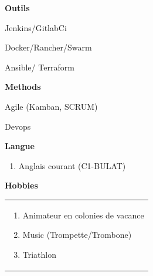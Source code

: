 \documentclass[a4paper,11pt,final]{memoir}
\newcommand{\SmallSep}{\vspace{0.2em}}
\newcommand{\CVSection}[1]
	{\Large\textbf{#1}\par
	\normalsize\normalfont}
\newcommand{\CVItem}[1]
	{\textbf{\color{RoyalBlue} #1}}
\begin{document}
\CVItem{Outils }
\begin{multicols}{3}
\begin{compactitem}[\color{RoyalBlue}$\circ$]
	\item Jenkins/GitlabCi
	\item  Docker/Rancher/Swarm
	\item  Ansible/ Terraform
\end{compactitem}
\end{multicols}
\CVItem{Methods}
\begin{multicols}{2}
\begin{compactitem}[\color{RoyalBlue}$\circ$]
	\item Agile (Kamban, SCRUM)
	\item  Devops
\end{compactitem}
\end{multicols}


\begin{minipage}{0.30\textwidth}
\CVSection{Langue }
\begin{enumerate}[\color{RoyalBlue}$\circ$]
  \item Anglais courant (C1-BULAT)\\

\end{enumerate}
\end{minipage}%
\hfill
\begin{minipage}{0.63\textwidth}
\SmallSep
\CVSection{Hobbies}
\begin{tabular}{|p{\textwidth}}
\begin{multicols}{1}
\begin{enumerate}[\color{RoyalBlue}$\circ$]
  \item Animateur en colonies de vacance 
  \item Music (Trompette/Trombone)   
\item Triathlon
\end{enumerate}
\end{multicols}
\end{tabular}
\end{minipage}%
\framebreak



\end{document}
